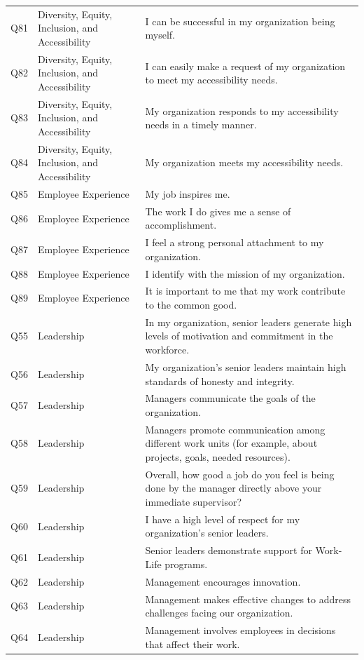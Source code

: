 \documentclass[
  man]{apa7}
\newenvironment{lltable}{\begin{landscape}\centering\begin{ThreePartTable}}{\end{ThreePartTable}\end{landscape}}
\begin{document}
\begin{lltable}
{\begin{longtable}{lll}
Q81 & Diversity, Equity, Inclusion, and Accessibility & I can be successful in my organization being myself.\\
Q82 & Diversity, Equity, Inclusion, and Accessibility & I can easily make a request of my organization to meet my accessibility needs.\\
Q83 & Diversity, Equity, Inclusion, and Accessibility & My organization responds to my accessibility needs in a timely manner.\\
Q84 & Diversity, Equity, Inclusion, and Accessibility & My organization meets my accessibility needs.\\
Q85 & Employee Experience & My job inspires me.\\
Q86 & Employee Experience & The work I do gives me a sense of accomplishment.\\
Q87 & Employee Experience & I feel a strong personal attachment to my organization.\\
Q88 & Employee Experience & I identify with the mission of my organization.\\
Q89 & Employee Experience & It is important to me that my work contribute to the common good.\\
Q55 & Leadership & In my organization, senior leaders generate high levels of motivation and commitment in the workforce.\\
Q56 & Leadership & My organization's senior leaders maintain high standards of honesty and integrity.\\
Q57 & Leadership & Managers communicate the goals of the organization.\\
Q58 & Leadership & Managers promote communication among different work units (for example, about projects, goals, needed resources).\\
Q59 & Leadership & Overall, how good a job do you feel is being done by the manager directly above your immediate supervisor?\\
Q60 & Leadership & I have a high level of respect for my organization's senior leaders.\\
Q61 & Leadership & Senior leaders demonstrate support for Work-Life programs.\\
Q62 & Leadership & Management encourages innovation.\\
Q63 & Leadership & Management makes effective changes to address challenges facing our organization.\\
Q64 & Leadership & Management involves employees in decisions that affect their work.\\

\end{longtable}}
\end{lltable}
\end{document}
